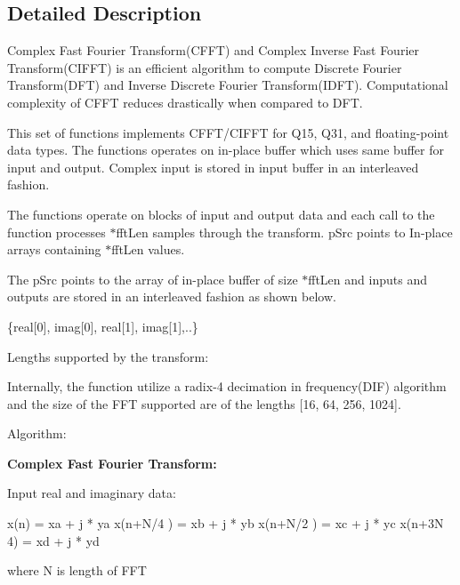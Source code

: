 \subsection{Detailed Description}
\begin{DoxyParagraph}{}
Complex Fast Fourier Transform(\-C\-F\-F\-T) and Complex Inverse Fast Fourier Transform(\-C\-I\-F\-F\-T) is an efficient algorithm to compute Discrete Fourier Transform(\-D\-F\-T) and Inverse Discrete Fourier Transform(\-I\-D\-F\-T). Computational complexity of C\-F\-F\-T reduces drastically when compared to D\-F\-T. 
\end{DoxyParagraph}
\begin{DoxyParagraph}{}
This set of functions implements C\-F\-F\-T/\-C\-I\-F\-F\-T for Q15, Q31, and floating-\/point data types. The functions operates on in-\/place buffer which uses same buffer for input and output. Complex input is stored in input buffer in an interleaved fashion.
\end{DoxyParagraph}
\begin{DoxyParagraph}{}
The functions operate on blocks of input and output data and each call to the function processes {$\ast$fft\-Len} samples through the transform. {\ttfamily p\-Src} points to In-\/place arrays containing {$\ast$fft\-Len} values. 
\end{DoxyParagraph}
\begin{DoxyParagraph}{}
The {\ttfamily p\-Src} points to the array of in-\/place buffer of size {$\ast$fft\-Len} and inputs and outputs are stored in an interleaved fashion as shown below. 
\begin{DoxyPre} \{real[0], imag[0], real[1], imag[1],..\} \end{DoxyPre}

\end{DoxyParagraph}
\begin{DoxyParagraph}{Lengths supported by the transform\-: }

\end{DoxyParagraph}
\begin{DoxyParagraph}{}
Internally, the function utilize a radix-\/4 decimation in frequency(\-D\-I\-F) algorithm and the size of the F\-F\-T supported are of the lengths \mbox{[}16, 64, 256, 1024\mbox{]}.
\end{DoxyParagraph}
\begin{DoxyParagraph}{Algorithm\-: }

\end{DoxyParagraph}
{\bfseries Complex Fast Fourier Transform\-:} \begin{DoxyParagraph}{}
Input real and imaginary data\-: 
\begin{DoxyPre}   
 x(n) = xa + j * ya   
 x(n+N/4 ) = xb + j * yb   
 x(n+N/2 ) = xc + j * yc   
 x(n+3N 4) = xd + j * yd   
 \end{DoxyPre}
 where N is length of F\-F\-T 
\end{DoxyParagraph}
